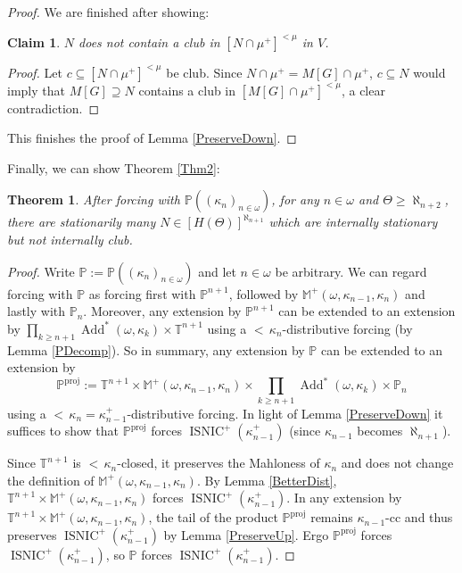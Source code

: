 \documentclass[12pt]{amsart}
\theoremstyle{definition}
\theoremstyle{remark}
\theoremstyle{plain}
\newtheorem{mysen}[mydef]{Theorem}
\newtheorem{myclaim}{Claim}
\numberwithin{mydef}{section}
\DeclareMathOperator{\Add}{Add}
\DeclareMathOperator{\ISNIC}{ISNIC}
\newcommand{\dM}{\mathbb{M}}
\newcommand{\dP}{\mathbb{P}}
\newcommand{\dT}{\mathbb{T}}
\begin{document}
\begin{proof}
		We are finished after showing:
		
		\begin{myclaim}
			$N$ does not contain a club in $[N\cap\mu^+]^{<\mu}$ in $V$.
		\end{myclaim}
		
		\begin{proof}
			Let $c\subseteq[N\cap\mu^+]^{<\mu}$ be club. Since $N\cap\mu^+=M[G]\cap\mu^+$, $c\subseteq N$ would imply that $M[G]\supseteq N$ contains a club in $[M[G]\cap\mu^+]^{<\mu}$, a clear contradiction.
		\end{proof}
		
		This finishes the proof of Lemma \ref{PreserveDown}.
	\end{proof}
	
	Finally, we can show Theorem \ref{Thm2}:
	
	\begin{mysen}
		After forcing with $\dP((\kappa_n)_{n\in\omega})$, for any $n\in\omega$ and $\Theta\geq\aleph_{n+2}$, there are stationarily many $N\in[H(\Theta)]^{\aleph_{n+1}}$ which are internally stationary but not internally club.
	\end{mysen}
	
	\begin{proof}
		Write $\dP:=\dP((\kappa_n)_{n\in\omega})$ and let $n\in\omega$ be arbitrary. We can regard forcing with $\dP$ as forcing first with $\dP^{n+1}$, followed by $\dM^+(\omega,\kappa_{n-1},\kappa_n)$ and lastly with $\dP_n$. Moreover, any extension by $\dP^{n+1}$ can be extended to an extension by $\prod_{k\geq n+1}\Add^*(\omega,\kappa_k)\times\dT^{n+1}$ using a ${<}\,\kappa_n$-distributive forcing (by Lemma \ref{PDecomp}). So in summary, any extension by $\dP$ can be extended to an extension by
		$$\dP^{\text{proj}}:=\dT^{n+1}\times\dM^+(\omega,\kappa_{n-1},\kappa_n)\times\prod_{k\geq n+1}\Add^*(\omega,\kappa_k)\times\dP_n$$
		using a ${<}\,\kappa_n=\kappa_{n-1}^+$-distributive forcing. In light of Lemma \ref{PreserveDown} it suffices to show that $\dP^{\text{proj}}$ forces $\ISNIC^+(\kappa_{n-1}^+)$ (since $\kappa_{n-1}$ becomes $\aleph_{n+1}$).
		
		Since $\dT^{n+1}$ is ${<}\,\kappa_n$-closed, it preserves the Mahloness of $\kappa_n$ and does not change the definition of $\dM^+(\omega,\kappa_{n-1},\kappa_n)$. By Lemma \ref{BetterDist}, $\dT^{n+1}\times\dM^+(\omega,\kappa_{n-1},\kappa_n)$ forces $\ISNIC^+(\kappa_{n-1}^+)$. In any extension by $\dT^{n+1}\times\dM^+(\omega,\kappa_{n-1},\kappa_n)$, the tail of the product $\dP^{\text{proj}}$ remains $\kappa_{n-1}$-cc and thus preserves $\ISNIC^+(\kappa_{n-1}^+)$ by Lemma \ref{PreserveUp}. Ergo $\dP^{\text{proj}}$ forces $\ISNIC^+(\kappa_{n-1}^+)$, so $\dP$ forces $\ISNIC^+(\kappa_{n-1}^+)$.
	\end{proof}
	
\end{document}
